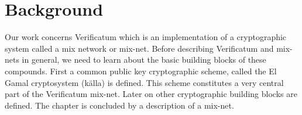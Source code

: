 \section{Background}

Our work concerns Verificatum which is an implementation of a
cryptographic system called a mix network or mix-net. Before
describing Verificatum and mix-nets in general, we need to learn about
the basic building blocks of these compounds. First a common public
key cryptographic scheme, called the El Gamal cryptosystem (källa) is
defined. This scheme constitutes a very central part of the
Verificatum mix-net. Later on other cryptographic building blocks are
defined. The chapter is concluded by a description of a mix-net.




